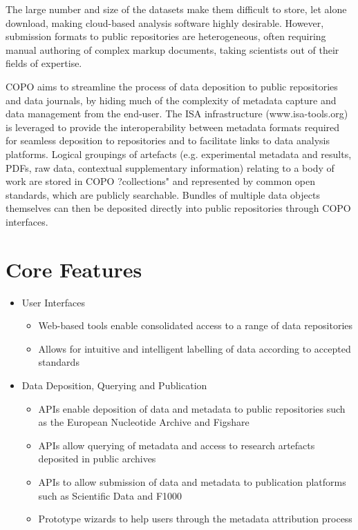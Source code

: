 \documentclass[runningheads,a4paper]{llncs}
\begin{document}
The large number and size of the datasets make them difficult to
store, let alone download, making cloud-based analysis software highly
desirable. However, submission formats to public repositories are
heterogeneous, often requiring manual authoring of complex markup
documents, taking scientists out of their fields of expertise.

COPO aims to streamline the process of data deposition to public
repositories and data journals, by hiding much of the complexity of
metadata capture and data management from the end-user. The ISA
infrastructure (www.isa-tools.org) is leveraged to provide the
interoperability between metadata formats required for seamless
deposition to repositories and to facilitate links to data analysis
platforms. Logical groupings of artefacts (e.g. experimental metadata
and results, PDFs, raw data, contextual supplementary information)
relating to a body of work are stored in COPO ?collections" and
represented by common open standards, which are publicly
searchable. Bundles of multiple data objects themselves can then be
deposited directly into public repositories through COPO interfaces.

\vspace*{-0.2in}
\section{Core Features}
\vspace*{-0.1in}
\begin{itemize}
\item User Interfaces
  \begin{itemize}
  \item Web-based tools enable consolidated access to a range of data
    repositories
  \item Allows for intuitive and intelligent labelling of data
    according to accepted standards
  \end{itemize}
\item Data Deposition, Querying and Publication
  \begin{itemize}
  \item APIs enable deposition of data and metadata to public
    repositories such as the European Nucleotide Archive and Figshare
  \item APIs allow querying of metadata and access to research
    artefacts deposited in public archives
  \item APIs to allow submission of data and metadata to publication
    platforms such as Scientific Data and F1000
  \item Prototype wizards to help users through the metadata
    attribution process
  \end{itemize}
\end{itemize}
\end{document}
